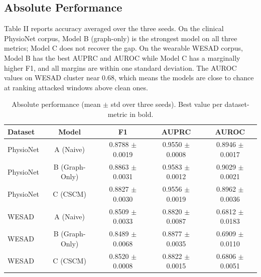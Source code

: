 \documentclass[conference]{IEEEtran}
\begin{document}
\subsection{Absolute Performance}
Table II reports accuracy averaged over the three seeds. On the clinical PhysioNet corpus, Model B (graph-only) is the strongest model on all three metrics; Model C does not recover the gap. On the wearable WESAD corpus, Model B has the best AUPRC and AUROC while Model C has a marginally higher F1, and all margins are within one standard deviation. The AUROC values on WESAD cluster near 0.68, which means the models are close to chance at ranking attacked windows above clean ones.
\begin{table}[t]
\caption{Absolute performance (mean $\pm$ std over three seeds). Best value per dataset-metric in bold.}
\label{tab:8}
\centering
\small
\begin{tabular}{lcccc}
\toprule
Dataset & Model & F1 & AUPRC & AUROC \\
\midrule
PhysioNet & A (Naive) & 0.8788 $\pm$ 0.0019 & 0.9550 $\pm$ 0.0008 & 0.8946 $\pm$ 0.0017 \\
PhysioNet & B (Graph-Only) & 0.8863 $\pm$ 0.0031 & 0.9583 $\pm$ 0.0012 & 0.9029 $\pm$ 0.0021 \\
PhysioNet & C (CSCM) & 0.8827 $\pm$ 0.0030 & 0.9556 $\pm$ 0.0019 & 0.8962 $\pm$ 0.0036 \\
WESAD & A (Naive) & 0.8509 $\pm$ 0.0033 & 0.8820 $\pm$ 0.0087 & 0.6812 $\pm$ 0.0183 \\
WESAD & B (Graph-Only) & 0.8489 $\pm$ 0.0068 & 0.8877 $\pm$ 0.0035 & 0.6909 $\pm$ 0.0110 \\
WESAD & C (CSCM) & 0.8520 $\pm$ 0.0008 & 0.8822 $\pm$ 0.0015 & 0.6806 $\pm$ 0.0051 \\
\bottomrule
\end{tabular}
\end{table}
\end{document}
